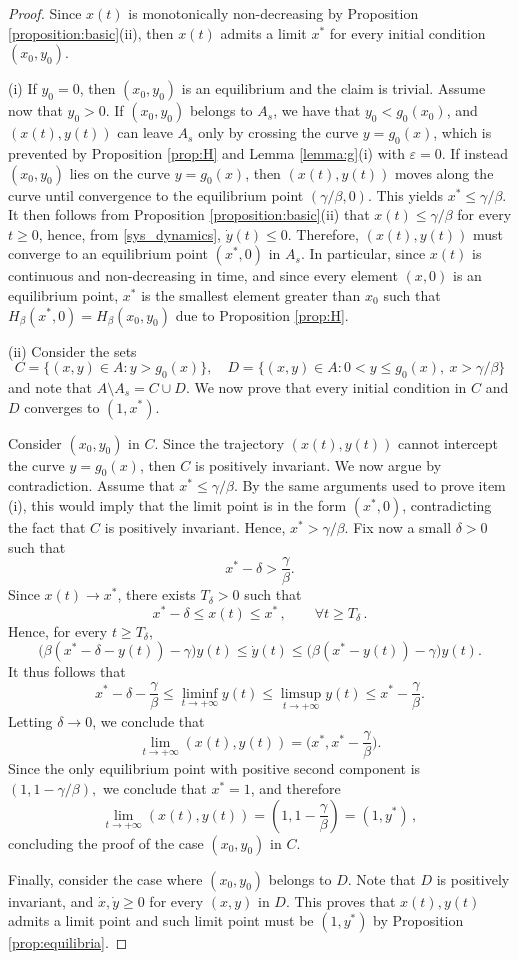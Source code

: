 \documentclass{article}
\begin{document}
\begin{proof}
Since $x(t)$ is monotonically non-decreasing by Proposition \ref{proposition:basic}(ii), then $x(t)$ admits a limit $x^*$ for every initial condition $(x_0,y_0)$. 

(i) If $y_0 = 0$, then $(x_0,y_0)$ is an equilibrium and the claim is trivial. Assume now that $y_0>0$. If $(x_0,y_0)$ belongs to $A_s$, we have that $y_0 < g_0(x_0)$, and $(x(t),y(t))$ can leave $A_s$ only by crossing the curve $y = g_0(x)$, which is prevented by Proposition \ref{prop:H} and Lemma \ref{lemma:g}(i) with $\varepsilon = 0$. If instead $(x_0,y_0)$ lies on the curve $y = g_0(x)$, then $(x(t),y(t))$ moves along the curve until convergence to the equilibrium point $(\gamma/\beta,0)$. This yields $x^* \le \gamma / \beta$. It then follows from Proposition \ref{proposition:basic}(ii) that $x(t) \le \gamma/\beta$ for every $t \ge 0$, hence, from \eqref{sys_dynamics}, $\dot y(t) \le 0$. Therefore, $(x(t),y(t))$ must converge to an equilibrium point $(x^*,0)$ in $A_s$. In particular, since $x(t)$ is continuous and non-decreasing in time, and since every element $(x,0)$ is an equilibrium point, $x^*$ is the smallest element greater than $x_0$ such that $H_\beta(x^*,0) = H_\beta(x_0,y_0)$ due to Proposition \ref{prop:H}.

(ii) Consider the sets $$C = \{(x,y) \in A: y > g_0(x)\}, \quad D = \{(x,y) \in A: 0 < y \le g_0(x), \ x > \gamma/\beta\}$$
and note that $A \setminus A_s = C \cup D$. We now prove that every initial condition in $C$ and $D$ converges to $(1,x^*)$. 

Consider $(x_0, y_0)$ in $C$. Since the trajectory $(x(t),y(t))$ cannot intercept the curve $y = g_0(x)$, then $C$ is positively invariant. We now argue by contradiction. Assume that $x^* \le \gamma /\beta$. By the same arguments used to prove item (i), this would imply that the limit point is in the form $(x^*,0)$, contradicting the fact that $C$ is positively invariant. Hence, $x^* > \gamma /\beta$.
Fix now a small $\delta>0$ such that
$$
x^*-\delta>\frac{\gamma}{\beta}.
$$
Since $x(t)\to x^*$, there exists $T_\delta>0$ such that
$$
x^* - \delta \le x(t) \le x^*\,,
\qquad \forall t\ge T_\delta\,.
$$
Hence, for every $t\ge T_\delta$,
$$
\big(\beta(x^*-\delta-y(t))-\gamma\big)y(t) \le \dot y(t)
\le
\big(\beta(x^*-y(t))-\gamma\big)y(t).
$$
It thus follows that
$$
x^*-\delta-\frac{\gamma}{\beta}
\le
\liminf_{t\to+\infty}y(t)
\le
\limsup_{t\to+\infty}y(t)
\le
x^*-\frac{\gamma}{\beta}.
$$
Letting $\delta\to0$, we conclude that
$$
\lim_{t \to + \infty} (x(t),y(t)) = \Big(x^*,x^*-\frac{\gamma}{\beta}\Big).$$
Since the only equilibrium point with positive second component is $(1,1-\gamma/\beta),
$
we conclude that $x^*=1$, and therefore
$$
\lim_{t \to +\infty} (x(t),y(t))
=
\left(1,1-\frac{\gamma}{\beta}\right) = (1,y^*)\,,
$$
concluding the proof of the case $(x_0,y_0)$ in $C$.

Finally, consider the case where $(x_0,y_0)$ belongs to $D$. Note that $D$ is positively invariant, and $\dot x,\dot y \ge 0$ for every $(x,y)$ in $D$. This proves that $x(t),y(t)$ admits a limit point and such limit point must be $(1,y^*)$ by Proposition \ref{prop:equilibria}.
\end{proof}
\end{document}
